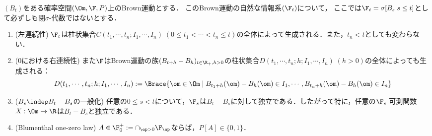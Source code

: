 \documentclass[uplatex,dvipdfmx]{jsreport}
\begin{document}
\begin{lemma}[自然な情報系の特徴付け]\label{lemma-Blumenthal}
    $(B_t)$をある確率空間$(\Om,\F,P)$上のBrown運動とする．
    このBrown運動の自然な情報系$(\F_t)$について，
    ここでは$\F_t=\sigma[B_s|s\le t]$として必ずしも閉$\sigma$-代数ではないとする．
    \begin{enumerate}
        \item (左連続性) $\F_t$は柱状集合$C(t_1,\cdots,t_n;I_1,\cdots,I_n)\;(0\le t_1<\cdots<t_n\le t)$の全体によって生成される．また，$t_n<t$としても変わらない．
        \item ($0$における右連続性) また$\F$はBrown運動の族$(B_{t+h}-B_h)_{t\in\R_+,h>0}$の柱状集合$D(t_1,\cdots,t_n;h;I_1,\cdots,I_n)\;(h>0)$の全体によっても生成される：
        \[D(t_1,\cdots,t_n;h;I_1,\cdots,I_n):=\Brace{\om\in\Om\mid B_{t_1+h}(\om)-B_{h}(\om)\in I_1,\cdots,B_{t_n+h}(\om)-B_h(\om)\in I_n}\]
        \item ($B_s\indep B_t-B_s$の一般化) 任意の$0\le s<t$について，$\F_s$は$B_t-B_s$に対して独立である．したがって特に，任意の$\F_s$-可測関数$X:\Om\to\R$は$B_t-B_s$と独立である．
        \item (Blumenthal one-zero law) $A\in\F_0^+:=\cap_{\ep>0}\F_\ep$ならば，$P[A]\in\{0,1\}$．
    \end{enumerate}
\end{lemma}
\end{document}
